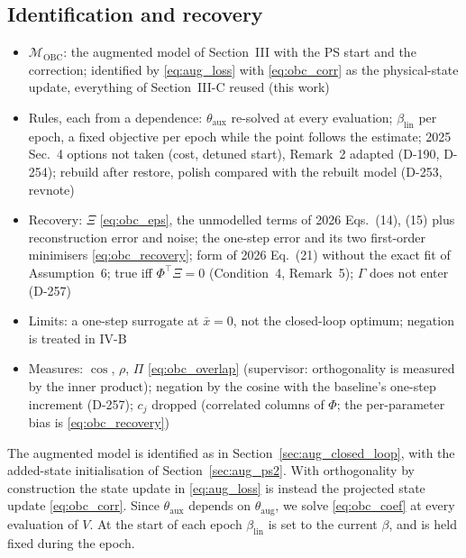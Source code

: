 \subsection{Identification and recovery}\label{sec:obc_ident}
\ifdraft
\begin{itemize}
\item $\mathcal M_{\mathrm{OBC}}$: the augmented model of Section~III with the PS start and the correction; identified by \eqref{eq:aug_loss} with \eqref{eq:obc_corr} as the physical-state update, everything of Section~III-C reused (this work)
\item Rules, each from a dependence: $\theta_{\mathrm{aux}}$ re-solved at every evaluation; $\beta_{\mathrm{lin}}$ per epoch, a fixed objective per epoch while the point follows the estimate; 2025 Sec.~4 options not taken (cost, detuned start), Remark~2 adapted (D-190, D-254); rebuild after restore, polish compared with the rebuilt model (D-253, revnote)
\item Recovery: $\Xi$ \eqref{eq:obc_eps}, the unmodelled terms of 2026 Eqs.~(14), (15) plus reconstruction error and noise; the one-step error and its two first-order minimisers \eqref{eq:obc_recovery}; form of 2026 Eq.~(21) without the exact fit of Assumption~6; true iff $\Phi^\top\Xi=0$ (Condition~4, Remark~5); $\Gamma$ does not enter (D-257)
\item Limits: a one-step surrogate at $\bar x=0$, not the closed-loop optimum; negation is treated in IV-B
\item Measures: $\cos$, $\rho$, $\Pi$ \eqref{eq:obc_overlap} (supervisor: orthogonality is measured by the inner product); negation by the cosine with the baseline's one-step increment (D-257); $c_j$ dropped (correlated columns of $\Phi$; the per-parameter bias is \eqref{eq:obc_recovery})
\end{itemize}
\fi
The augmented model is identified as in Section~\ref{sec:aug_closed_loop},
with the added-state
initialisation of Section~\ref{sec:aug_ps2}.
With orthogonality by construction the state update in \eqref{eq:aug_loss} is instead
the projected state update \eqref{eq:obc_corr}.
Since $\theta_{\mathrm{aux}}$ depends on $\theta_{\mathrm{aug}}$,
we solve \eqref{eq:obc_coef} at every evaluation of $V$.
At the start of each epoch $\beta_{\mathrm{lin}}$ is set to the current $\beta$, 
and is held fixed during the epoch.

